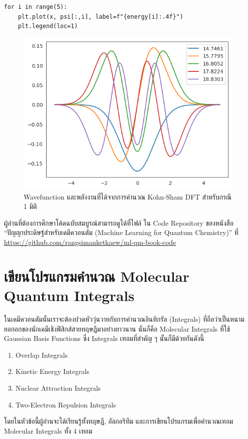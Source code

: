 \begin{lstlisting}[style=MyPython]
for i in range(5):
    plt.plot(x, psi[:,i], label=f"{energy[i]:.4f}")
    plt.legend(loc=1)
\end{lstlisting}

\vspace{5pt}

\begin{figure}[H]
  \centering
  \includegraphics[width=0.7\linewidth]{fig/ks_dft_1d_wfn_ener.png}
  \caption{Wavefunction และพลังงานที่ได้จากการคำนวณ Kohn-Sham DFT สำหรับกรณี 1 มิติ}
  \label{fig:ks_dft_1d_wfn_ener}
\end{figure}

ผู้อ่านที่ต้องการศึกษาโค้ดฉบับสมบูรณ์สามารถดูได้ที่ไฟล์  ใน Code Repository ของหนังสือ \enquote{ปัญญาประดิษฐ์สำหรับเคมีควอนตัม (Machine Learning for Quantum Chemistry)} ที่ \url{https://github.com/rangsimanketkaew/ml-qm-book-code}

\section{เขียนโปรแกรมคำนวณ Molecular Quantum Integrals }

ในเคมีควอนตัมนั้นเราจะต้องปวดหัววุ่นวายกับการคำนวณอินทิกรัล (Integrals) ที่ถือว่าเป็นหนามยอกอกของนักเคมีเชิงฟิสิกส์สายทฤษฎีมาอย่างยาวนาน นั่นก็คือ Molecular Integrals ที่ใช้ Gaussian Basis Functions ซึ่ง Integrals เทอมที่สำคัญ ๆ นั้นก็มีด้วยกันดังนี้
%
\begin{enumerate}[topsep=0pt,noitemsep]
  \setlength\itemsep{0.5em}
  \item Overlap Integrals

  \item Kinetic Energy Integrals

  \item Nuclear Attraction Integrals

  \item Two-Electron Repulsion Integrals
\end{enumerate}
%
โดยในหัวข้อนี้ผู้อ่านจะได้เรียนรู้ทั้งทฤษฎี, อัลกอริทึม และการเขียนโปรแกรมเพื่อคำนวณเทอม Molecular Integrals ทั้ง 4 เทอม

